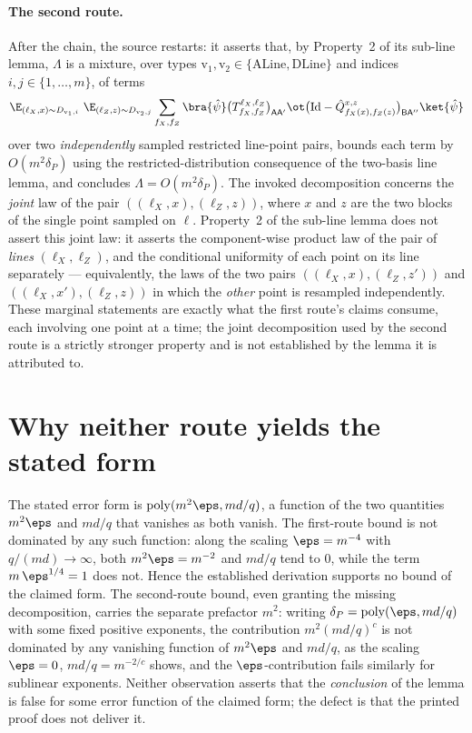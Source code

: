 \documentclass[11pt]{article}
\DeclareMathOperator{\poly}{poly}
\newcommand{\Id}{\mathrm{Id}}
\begin{document}
\paragraph{The second route.}
After the chain, the source restarts: it asserts that, by Property~2 of
its sub-line lemma, $\Lambda$ is a mixture, over types
$\mathrm{v}_1, \mathrm{v}_2 \in \{\mathrm{ALine}, \mathrm{DLine}\}$ and
indices $i, j \in \{1, \dots, m\}$, of terms
\begin{equation*}
  \E_{(\ell_X, x) \sim D_{\mathrm{v}_1,i}}\
  \E_{(\ell_Z, z) \sim D_{\mathrm{v}_2,j}}
  \sum_{f_X,f_Z} \bra{\hat\psi}
  \big(T^{\ell_X,\ell_Z}_{f_X,f_Z}\big)_{\mathsf{A}\mathsf{A}'} \ot
  \big(\Id - \hat{Q}^{x,z}_{f_X(x),f_Z(z)}\big)_{\mathsf{B}\mathsf{A}''}
  \ket{\hat\psi}
\end{equation*}
over two \emph{independently} sampled restricted line-point pairs,
bounds each term by $O(m^2\delta_P)$ using the restricted-distribution
consequence of the two-basis line lemma, and concludes
$\Lambda = O(m^2\delta_P)$.  The invoked decomposition concerns the
\emph{joint} law of the pair $((\ell_X, x), (\ell_Z, z))$, where $x$ and
$z$ are the two blocks of the single point sampled on $\ell$.  Property~2
of the sub-line lemma does not assert this joint law: it asserts the
component-wise product law of the pair of \emph{lines}
$(\ell_X, \ell_Z)$, and the conditional uniformity of each point on its
line separately --- equivalently, the laws of the two pairs
$((\ell_X, x), (\ell_Z, z'))$ and $((\ell_X, x'), (\ell_Z, z))$ in which
the \emph{other} point is resampled independently.  These marginal
statements are exactly what the first route's claims consume, each
involving one point at a time; the joint decomposition used by the
second route is a strictly stronger property and is not established by
the lemma it is attributed to.

\section{Why neither route yields the stated form}

The stated error form is $\poly(m^2\eps, md/q)$, a function of the two
quantities $m^2\eps$ and $md/q$ that vanishes as both vanish.  The
first-route bound is not dominated by any such function: along the
scaling $\eps = m^{-4}$ with $q/(md) \to \infty$, both $m^2\eps = m^{-2}$
and $md/q$ tend to $0$, while the term $m\,\eps^{1/4} = 1$ does not.
Hence the established derivation supports no bound of the claimed form.
The second-route bound, even granting the missing decomposition, carries
the separate prefactor $m^2$: writing $\delta_P = \poly(\eps, md/q)$
with some fixed positive exponents, the contribution
$m^2 (md/q)^{c}$ is not dominated by any vanishing function of $m^2\eps$
and $md/q$, as the scaling $\eps = 0$, $md/q = m^{-2/c}$ shows, and the
$\eps$-contribution fails similarly for sublinear exponents.  Neither
observation asserts that the \emph{conclusion} of the lemma is false for
some error function of the claimed form; the defect is that the printed
proof does not deliver it.
\end{document}

